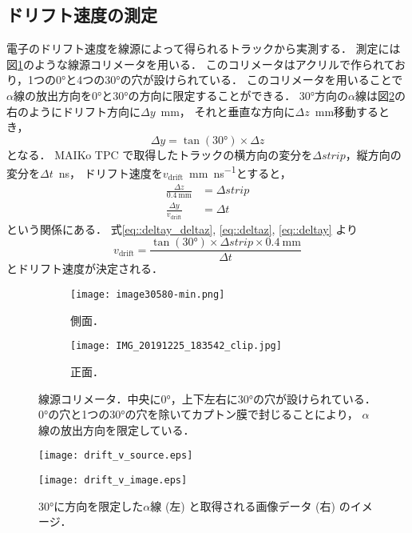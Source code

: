 \documentclass[../master]{subfiles}
\begin{document}
\subsection{ドリフト速度の測定}
電子のドリフト速度を線源によって得られるトラックから実測する．
測定には図\ref{pic::alpha_collimator}のような線源コリメータを用いる．
このコリメータはアクリルで作られており，1つの\ang{0}と4つの\ang{30}の穴が設けられている．
このコリメータを用いることで$\alpha$線の放出方向を\ang{0}と\ang{30}の方向に限定することができる．
\ang{30}方向の$\alpha$線は図\ref{fig::drift_v_image}の右のようにドリフト方向に$\Delta y$~\si{\milli\metre}，
それと垂直な方向に$\Delta z$~\si{\milli\metre}移動するとき，
\begin{equation}
  \Delta y = \tan(\ang{30})\times\Delta z \label{eq::deltay_deltaz}
\end{equation}
となる．
MAIKo TPC で取得したトラックの横方向の変分を$\Delta strip$，縦方向の変分を$\Delta t$~\si{\nano\second}，
ドリフト速度を$v_{\text{drift}}$~\si{\milli\metre\per\nano\second}とすると，
\begin{align}
  \frac{\Delta z}{\SI{0.4}{\milli\metre}} & = \Delta strip \label{eq::deltaz}\\
  \frac{\Delta y}{v_{\text{drift}}} & = \Delta t \label{eq::deltay}
\end{align}
という関係にある．
式\eqref{eq::deltay_deltaz}, \eqref{eq::deltaz}, \eqref{eq::deltay} より
\begin{equation}
  v_{\text{drift}} = \frac{\tan(\ang{30})\times\Delta strip\times\SI{0.4}{\milli\metre}}{\Delta t}
\end{equation}
とドリフト速度が決定される．
\begin{figure}
  \centering
  \begin{subfigure}{0.45\columnwidth}
    \centering
    \texttt{[image: image30580-min.png]}
    \caption{側面．}
  \end{subfigure}
  \begin{subfigure}{0.45\columnwidth}
    \centering
    \texttt{[image: IMG\_20191225\_183542\_clip.jpg]}
    \caption{正面．}
  \end{subfigure}
  \caption[線源コリメータ．]
          {線源コリメータ．中央に\ang{0}，上下左右に\ang{30}の穴が設けられている．
            \ang{0}の穴と1つの\ang{30}の穴を除いてカプトン膜で封じることにより，
            $\alpha$線の放出方向を限定している．
          }
          \label{pic::alpha_collimator}
\end{figure}
\begin{figure}
  \centering
  \begin{minipage}{0.45\columnwidth}
    \centering
    \texttt{[image: drift\_v\_source.eps]}
  \end{minipage}
  \begin{minipage}{0.45\columnwidth}
    \centering
    \texttt{[image: drift\_v\_image.eps]}
  \end{minipage}
  \caption[\ang{30}に方向を限定した$\alpha$線と取得される画像データのイメージ．]
          {\ang{30}に方向を限定した$\alpha$線 (左) と取得される画像データ (右) のイメージ．}
  \label{fig::drift_v_image}
\end{figure}
\end{document}
